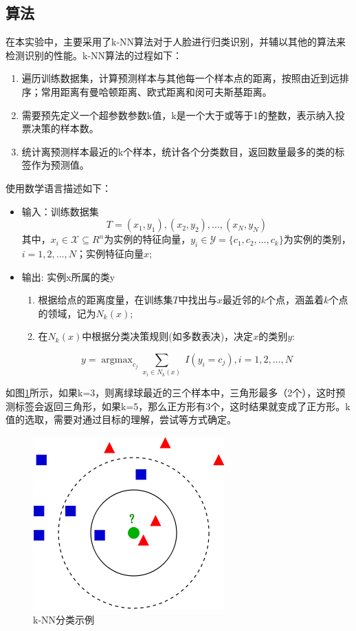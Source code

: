 \documentclass{article}
\begin{document}
\subsection{算法}
\label{sub:suan_fa_}
\par 在本实验中，主要采用了k-NN算法对于人脸进行归类识别，并辅以其他的算法来检测识别的性能。k-NN算法的过程如下：
\begin{enumerate}
    \item 遍历训练数据集，计算预测样本与其他每一个样本点的距离，按照由近到远排序；常用距离有曼哈顿距离、欧式距离和闵可夫斯基距离。
    \item 需要预先定义一个超参数参数k值，k是一个大于或等于1的整数，表示纳入投票决策的样本数。
    \item 统计离预测样本最近的k个样本，统计各个分类数目，返回数量最多的类的标签作为预测值。
\end{enumerate}
\par 使用数学语言描述如下：
\begin{itemize}
    \item 输入：训练数据集
        \[T={(x_1,y_1),(x_2,y_2),...,(x_N,y_N)}\]
        其中，\(x_i \in \mathcal{X} \subseteq R^n\)为实例的特征向量，\(y_i \in \mathcal{Y}=\{c_1,c_2,...,c_k\}\)为实例的类别，\(i=1,2,...,N\)；实例特征向量\(x\);
    \item 输出: 实例x所属的类y
        \begin{enumerate}
            \item 根据给点的距离度量，在训练集\(T\)中找出与\(x\)最近邻的\(k\)个点，涵盖着\(k\)个点的领域，记为\(N_k(x)\);
            \item 在\(N_k(x)\)中根据分类决策规则(如多数表决)，决定\(x\)的类别\(y\):
        \end{enumerate}
        \[y=\mathop{argmax}_{c_j} {\sum}_{x_i \in  N_k(x)} \; I(y_i=c_j) , i=1,2,...,N\]
\end{itemize}

\par 如图\ref{fig:knn}所示，如果k=3，则离绿球最近的三个样本中，三角形最多（2个），这时预测标签会返回三角形，如果k=5，那么正方形有3个，这时结果就变成了正方形。k值的选取，需要对通过目标的理解，尝试等方式确定。


\begin{figure}[htpb]
    \centering
    \includegraphics[width=0.4\linewidth]{knn.png}
    \caption{k-NN分类示例}
    \label{fig:knn}
\end{figure}
\FloatBarrier
\end{document}
